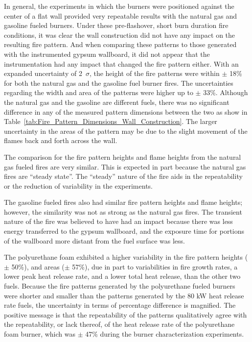 \documentclass[twoside]{uocthesis}
\begin{document}
{In general, the experiments in which the burners were positioned against the center of a flat wall provided very repeatable results with the natural gas and gasoline fueled burners. Under these pre-flashover, short burn duration fire conditions, it was clear the wall construction did not have any impact on the resulting fire pattern.  And when comparing these patterns to those generated with the instrumented gypsum wallboard, it did not appear that the instrumentation had any impact that changed the fire pattern either.  With an expanded uncertainty of 2~$\sigma$, the height of the fire patterns were within $\pm$ 18\% for both the natural gas and the gasoline fuel burner fires.  The uncertainties regarding the width and area of the patterns were higher up to $\pm$ 33\%.  Although the natural gas and the gasoline are different fuels, there was no significant difference in any of the measured pattern dimensions between the two as show in Table~\ref{tab:Fire_Pattern_Dimensions_Wall_Construction}.  The larger uncertainty in the areas of the pattern may be due to the slight movement of the flames back and forth across the wall.    

The comparison for the fire pattern heights and flame heights from the natural gas fueled fires are very similar.  This is expected in part because the natural gas fires are “steady state”.  The “steady” nature of the fire aids in the repeatability or the reduction of variability in the experiments.  

The gasoline fueled fires also had similar fire pattern heights and flame heights; however, the similarity was not as strong as the natural gas fires.  The transient nature of the fire was believed to have had an impact because there was less energy transferred to the gypsum wallboard, and the exposure time for portions of the wallboard more distant from the fuel surface was less.  

The polyurethane foam exhibited a higher variability in the fire pattern heights ($\pm$ 50\%), and areas ($\pm$ 57\%), due in part to variabilities in fire growth rates, a lower peak heat release rate, and a lower total heat release, than the other two fuels. Because the fire patterns generated by the polyurethane fueled burners were shorter and smaller than the patterns generated by the 80 kW heat release rate fuels, the uncertainty in terms of percentage difference is magnified.  The positive message is that the repeatability of the patterns qualitatively agree with the repeatability, or lack thereof, of the heat release rate of the polyurethane foam burner, which was $\pm$ 47\% during the burner characterization experiments.     

}
\end{document}
